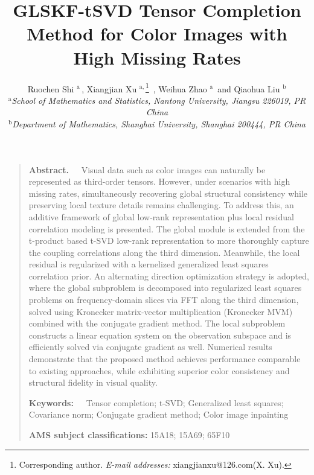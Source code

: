 \documentclass[a4paper,12pt]{article}
\numberwithin{equation}{section}
\numberwithin{algorithm}{section}
\newcommand{\liuhao}{\fontsize{9pt}{10}\selectfont}
\theoremstyle{remark}
\theoremstyle{definition}
\begin{document}
\title{GLSKF-tSVD Tensor Completion Method for Color Images with High Missing Rates}
\author{Ruochen Shi $^{\mathrm{a}}$\,, Xiangjian Xu $^{\mathrm{a,}}$\thanks{\liuhao Corresponding author.   \newline
		\hspace*{17pt}\emph{E-mail addresses:} xiangjianxu@126.com(X. Xu).} \,, Weihua Zhao $^{\mathrm{a}}$\, and  Qiaohua Liu $^{\mathrm{b}}$\\
$^{\mathrm{a}}${\it\liuhao School of Mathematics and Statistics, Nantong University, Jiangsu 226019, PR China}\\
$^{\mathrm{b}}${\it\liuhao Department of Mathematics, Shanghai University, Shanghai 200444, PR China}	
}
\date{}
\maketitle
\begin{quote}
{\bf Abstract.~~} 
Visual data such as color images can naturally be represented as third-order tensors. However, under scenarios with high missing rates, simultaneously recovering global structural consistency while preserving local texture details remains challenging. To address this, an additive framework of global low-rank representation plus local residual correlation modeling is presented. The global module is extended from the  t-product based  t-SVD low-rank representation to more thoroughly capture the coupling correlations along the third dimension. Meanwhile, the local residual is regularized with a kernelized generalized least squares correlation prior.  
An alternating direction optimization strategy is adopted, where the global subproblem is decomposed into regularized least squares problems on frequency-domain slices via FFT along the third dimension, solved using Kronecker matrix-vector multiplication (Kronecker MVM) combined with the conjugate gradient method. The local subproblem constructs a linear equation system on the observation subspace and is efficiently solved via conjugate gradient as well.  
Numerical results demonstrate that the proposed method achieves performance comparable to existing approaches, while exhibiting superior color consistency and structural fidelity in visual quality.

{\bf Keywords:~~} Tensor completion;  t-SVD; Generalized least squares; Covariance norm; Conjugate gradient method; Color image inpainting

{\bf AMS subject classifications: } 15A18; 15A69; 65F10
\end{quote}
\end{document}
